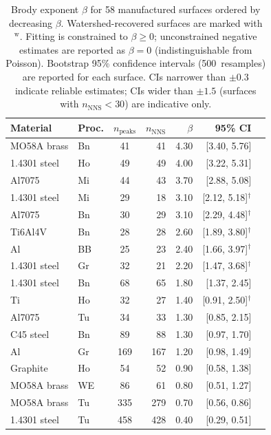 \documentclass[final,3p,times,twocolumn]{elsarticle}
\theoremstyle{definition}
\begin{document}
\begin{table}[htbp]
  \centering
  \caption{Brody exponent $\beta$ for 58 manufactured surfaces
           ordered by decreasing $\beta$. Watershed-recovered
           surfaces are marked with $^{\text{w}}$. Fitting is constrained
           to $\beta \geq 0$; unconstrained negative estimates
           are reported as $\beta = 0$ (indistinguishable from
           Poisson). Bootstrap 95\% confidence intervals
           (500~resamples) are reported for each surface.
           CIs narrower than $\pm 0.3$ indicate reliable
           estimates; CIs wider than $\pm 1.5$ (surfaces with
           $n_{\text{NNS}} < 30$) are indicative only.}
  \label{tab:brody}
  \small
  \begin{tabular}{@{}llcrrrc@{}}
    \toprule
    Material & Proc. & $n_{\text{peaks}}$ & $n_{\text{NNS}}$ &
    $\beta$ & 95\% CI \\
    \midrule
    MO58A brass & Bn & 41 & 41 & 4.30 & [3.40, 5.76] \\
    1.4301 steel & Ho & 49 & 49 & 4.00 & [3.22, 5.31] \\
    Al7075 & Mi & 44 & 43 & 3.70 & [2.88, 5.08] \\
    1.4301 steel & Mi & 29 & 18 & 3.10 & [2.12, 5.18]$^{\dagger}$ \\
    Al7075 & Bn & 30 & 29 & 3.10 & [2.29, 4.48]$^{\dagger}$ \\
    Ti6Al4V & Bn & 28 & 28 & 2.60 & [1.89, 3.80]$^{\dagger}$ \\
    Al & BB & 25 & 23 & 2.40 & [1.66, 3.97]$^{\dagger}$ \\
    1.4301 steel & Gr & 32 & 21 & 2.20 & [1.47, 3.68]$^{\dagger}$ \\
    1.4301 steel & Bn & 68 & 65 & 1.80 & [1.37, 2.45] \\
    Ti & Ho & 32 & 27 & 1.40 & [0.91, 2.50]$^{\dagger}$ \\
    Al7075 & Tu & 34 & 33 & 1.30 & [0.85, 2.15] \\
    C45 steel & Bn & 89 & 88 & 1.30 & [0.97, 1.70] \\
    Al & Gr & 169 & 167 & 1.20 & [0.98, 1.49] \\
    Graphite & Ho & 54 & 52 & 0.90 & [0.58, 1.38] \\
    MO58A brass & WE & 86 & 61 & 0.80 & [0.51, 1.27] \\
    MO58A brass & Tu & 335 & 279 & 0.70 & [0.56, 0.86] \\
    1.4301 steel & Tu & 458 & 428 & 0.40 & [0.29, 0.51] \\

\end{tabular}
\end{table}
\end{document}
